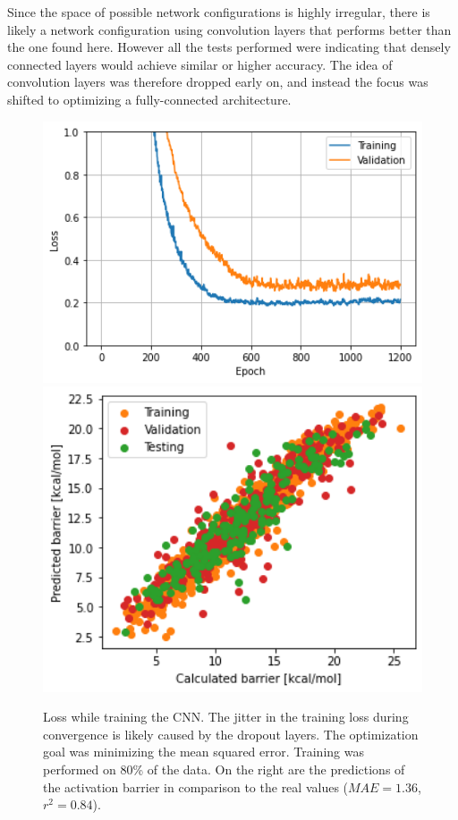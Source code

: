 Since the space of possible network configurations is highly irregular, there is likely a network configuration using convolution layers 
that performs better than the one found here.
However all the tests performed were indicating that densely connected layers would achieve similar or higher accuracy.
The idea of convolution layers was therefore dropped early on, and instead the focus was shifted to optimizing a fully-connected architecture.
\\ 

\begin{figure}[!htb]
    \endminipage\hfill
      \includegraphics[width=1.0\textwidth]{figures/regression/fourier/cnn/lossCNN.png}
    \endminipage\hfill
      \includegraphics[width=1.0\textwidth]{figures/regression/fourier/cnn/scatterCNN.png}
    \endminipage\hfill
    \endminipage
    \caption[CNN trained on LEFD features]{
        Loss while training the CNN. The jitter in the training loss during convergence is likely caused by the dropout layers. 
        The optimization goal was minimizing the mean squared error. 
        Training was performed on 80\% of the data.
        On the right are the predictions of the activation barrier in comparison to the real values ($MAE=1.36$, $r^2=0.84$).
    }
    \label{fig:fourier_cnn}
\end{figure}


